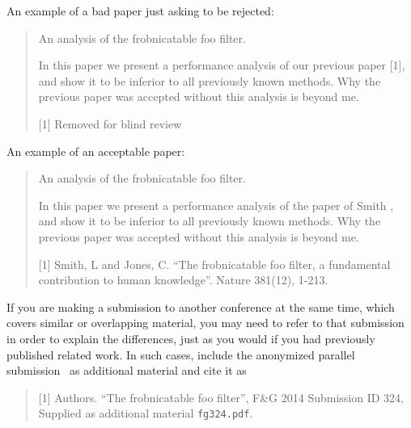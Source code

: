 \documentclass[10pt,twocolumn,letterpaper]{article}
\begin{document}
 




An example of a bad paper just asking to be rejected:
\begin{quote}
\begin{center}
    An analysis of the frobnicatable foo filter.
\end{center}

   In this paper we present a performance analysis of our
   previous paper [1], and show it to be inferior to all
   previously known methods.  Why the previous paper was
   accepted without this analysis is beyond me.

   [1] Removed for blind review
\end{quote}


An example of an acceptable paper:

\begin{quote}
\begin{center}
     An analysis of the frobnicatable foo filter.
\end{center}

   In this paper we present a performance analysis of the
   paper of Smith \etal [1], and show it to be inferior to
   all previously known methods.  Why the previous paper
   was accepted without this analysis is beyond me.

   [1] Smith, L and Jones, C. ``The frobnicatable foo
   filter, a fundamental contribution to human knowledge''.
   Nature 381(12), 1-213.
\end{quote}

If you are making a submission to another conference at the same time,
which covers similar or overlapping material, you may need to refer to that
submission in order to explain the differences, just as you would if you
had previously published related work.  In such cases, include the
anonymized parallel submission~\cite{Authors14} as additional material and
cite it as
\begin{quote}
[1] Authors. ``The frobnicatable foo filter'', F\&G 2014 Submission ID 324,
Supplied as additional material {\tt fg324.pdf}.
\end{quote}
\end{document}

